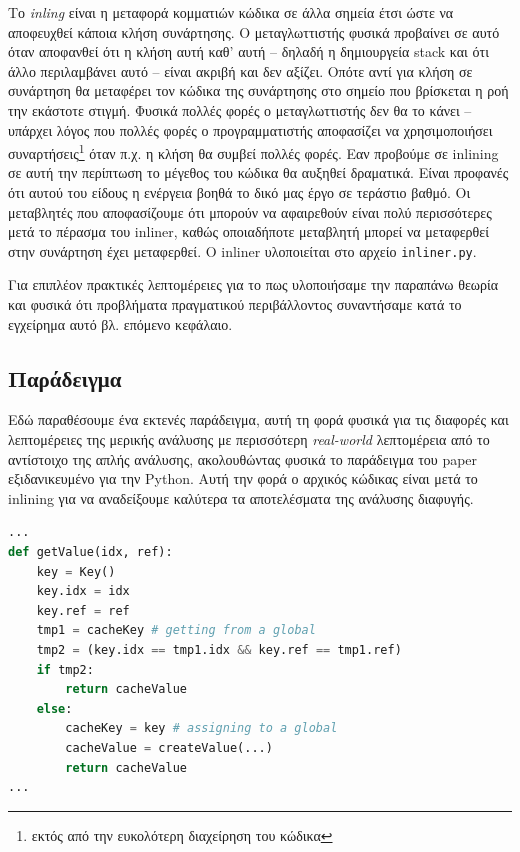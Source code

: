 Το \textit{inling} είναι η μεταφορά κομματιών κώδικα σε άλλα σημεία έτσι ώστε να
αποφευχθεί κάποια κλήση συνάρτησης. Ο μεταγλωττιστής φυσικά προβαίνει σε αυτό
όταν αποφανθεί ότι η κλήση αυτή καθ' αυτή – δηλαδή η δημιουργεία stack και ότι
άλλο περιλαμβάνει αυτό – είναι ακριβή και δεν αξίζει. Οπότε αντί για κλήση σε
συνάρτηση θα μεταφέρει τον κώδικα της συνάρτησης στο σημείο που βρίσκεται η ροή
την εκάστοτε στιγμή. Φυσικά πολλές φορές ο μεταγλωττιστής δεν θα το κάνει –
υπάρχει λόγος που πολλές φορές ο προγραμματιστής αποφασίζει να χρησιμοποιήσει
συναρτήσεις\footnote{εκτός από την ευκολότερη διαχείρηση του κώδικα} όταν π.χ. η
κλήση θα συμβεί πολλές φορές. Εαν προβούμε σε inlining σε αυτή την περίπτωση το
μέγεθος του κώδικα θα αυξηθεί δραματικά. Είναι προφανές ότι αυτού του είδους η
ενέργεια βοηθά το δικό μας έργο σε τεράστιο βαθμό. Οι μεταβλητές που
αποφασίζουμε ότι μπορούν να αφαιρεθούν είναι πολύ περισσότερες μετά το πέρασμα
του inliner, καθώς οποιαδήποτε μεταβλητή μπορεί να μεταφερθεί στην συνάρτηση
έχει μεταφερθεί. Ο inliner υλοποιείται στο αρχείο \texttt{inliner.py}.

Για επιπλέον πρακτικές λεπτομέρειες για το πως υλοποιήσαμε την παραπάνω θεωρία
και φυσικά ότι προβλήματα πραγματικού περιβάλλοντος συναντήσαμε κατά το
εγχείρημα αυτό βλ. επόμενο κεφάλαιο.


\subsection{Παράδειγμα}

Εδώ παραθέσουμε ένα εκτενές παράδειγμα, αυτή τη φορά φυσικά για τις διαφορές και
λεπτομέρειες της μερικής ανάλυσης με περισσότερη \textit{real-world} λεπτομέρεια
από το αντίστοιχο της απλής ανάλυσης, ακολουθώντας φυσικά το παράδειγμα του
paper\cite{stadler2014partial} εξιδανικευμένο για την Python. Αυτή την φορά ο
αρχικός κώδικας είναι μετά το inlining για να αναδείξουμε καλύτερα τα
αποτελέσματα της ανάλυσης διαφυγής.

\begin{lstlisting}[language=Python]
...
def getValue(idx, ref):
    key = Key()
    key.idx = idx
    key.ref = ref
    tmp1 = cacheKey # getting from a global
    tmp2 = (key.idx == tmp1.idx && key.ref == tmp1.ref)
    if tmp2:
        return cacheValue
    else:
        cacheKey = key # assigning to a global
        cacheValue = createValue(...)
        return cacheValue
...
\end{lstlisting}

